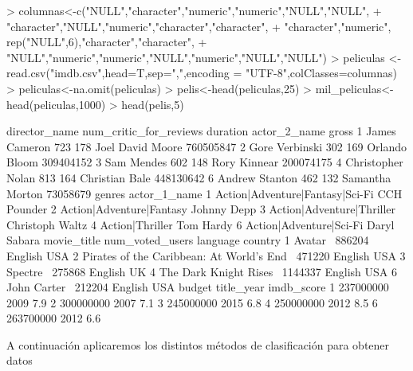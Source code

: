 \documentclass[a4paper]{article}
\begin{document}
\begin{Schunk}
\begin{Sinput}
> columnas<-c("NULL","character","numeric","numeric","NULL","NULL",
+             "character","NULL","numeric","character","character",
+             "character","numeric", rep("NULL",6),"character","character",
+             "NULL","numeric","numeric","NULL","numeric","NULL","NULL")
> peliculas <- read.csv("imdb.csv",head=T,sep=",",encoding = "UTF-8",colClasses=columnas)
> peliculas<-na.omit(peliculas)
> pelis<-head(peliculas,25)
> mil_peliculas<-head(peliculas,1000)
> head(pelis,5)
\end{Sinput}
\begin{Soutput}
      director_name num_critic_for_reviews duration     actor_2_name     gross
1     James Cameron                    723      178 Joel David Moore 760505847
2    Gore Verbinski                    302      169    Orlando Bloom 309404152
3        Sam Mendes                    602      148     Rory Kinnear 200074175
4 Christopher Nolan                    813      164   Christian Bale 448130642
6    Andrew Stanton                    462      132  Samantha Morton  73058679
                           genres    actor_1_name
1 Action|Adventure|Fantasy|Sci-Fi     CCH Pounder
2        Action|Adventure|Fantasy     Johnny Depp
3       Action|Adventure|Thriller Christoph Waltz
4                 Action|Thriller       Tom Hardy
6         Action|Adventure|Sci-Fi    Daryl Sabara
                                movie_title num_voted_users language country
1                                   Avatar           886204  English     USA
2 Pirates of the Caribbean: At World's End           471220  English     USA
3                                  Spectre           275868  English      UK
4                    The Dark Knight Rises          1144337  English     USA
6                              John Carter           212204  English     USA
     budget title_year imdb_score
1 237000000       2009        7.9
2 300000000       2007        7.1
3 245000000       2015        6.8
4 250000000       2012        8.5
6 263700000       2012        6.6
\end{Soutput}
\end{Schunk}
A continuación aplicaremos los distintos métodos de clasificación para obtener datos
\end{document}

